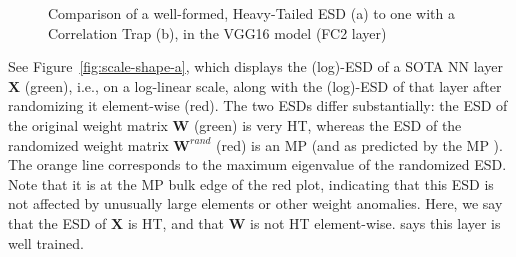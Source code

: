 \begin{figure}[ht]
    \centering
    \caption{Comparison of a well-formed, Heavy-Tailed ESD (a) to one with a Correlation Trap (b), in the VGG16 model (FC2 layer)}
  \label{fig:scale-shape}                                                                                                      
\end{figure}

See Figure~\ref{fig:scale-shape-a}, which displays the (log)-ESD of a \Typical SOTA NN layer $\mathbf{X}$ (green), i.e., on a log-linear scale, along with the (log)-ESD of that layer after randomizing it element-wise (red).
The two ESDs differ substantially:
the ESD of the original weight matrix  $\mathbf{W}$ (green) is very HT, whereas 
the ESD of the randomized weight matrix  $\mathbf{W}^{rand}$ (red) is an MP (and as predicted by the MP \RMT).
The orange line corresponds to the maximum eigenvalue of the randomized ESD.
Note that it is at the MP bulk edge of the red plot, indicating that this ESD is not affected by unusually large elements or other weight anomalies.
Here, we say that the ESD of $\mathbf{X}$ is HT, and that $\mathbf{W}$ is not HT element-wise.
\HTSR says this layer is well trained.

